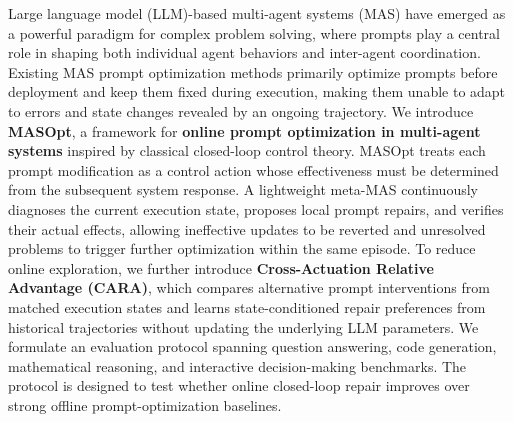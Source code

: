 Large language model (LLM)-based multi-agent systems (MAS) have emerged as a powerful paradigm for complex problem solving, where prompts play a central role in shaping both individual agent behaviors and inter-agent coordination.
Existing MAS prompt optimization methods primarily optimize prompts before deployment and keep them fixed during execution, making them unable to adapt to errors and state changes revealed by an ongoing trajectory.
We introduce \textbf{MASOpt}, a framework for \textbf{online prompt optimization in multi-agent systems} inspired by classical closed-loop control theory.
MASOpt treats each prompt modification as a control action whose effectiveness must be determined from the subsequent system response.
A lightweight meta-MAS continuously diagnoses the current execution state, proposes local prompt repairs, and verifies their actual effects, allowing ineffective updates to be reverted and unresolved problems to trigger further optimization within the same episode.
To reduce online exploration, we further introduce \textbf{Cross-Actuation Relative Advantage (CARA)}, which compares alternative prompt interventions from matched execution states and learns state-conditioned repair preferences from historical trajectories without updating the underlying LLM parameters.
We formulate an evaluation protocol spanning question answering, code generation, mathematical reasoning, and interactive decision-making benchmarks. The protocol is designed to test whether online closed-loop repair improves over strong offline prompt-optimization baselines.
